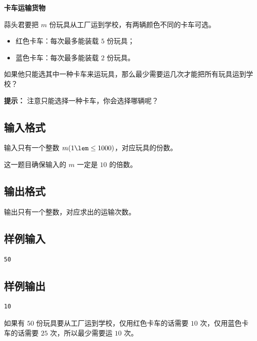 \documentclass{article}
\newcommand{\problemname}[1]{\begin{center}\Large\bfseries #1\end{center}}
\begin{document}
\problemname{卡车运输货物}

蒜头君要把 $m$ 份玩具从工厂运到学校，有两辆颜色不同的卡车可选。

\begin{itemize}
  \item 红色卡车：每次最多能装载 $5$ 份玩具；

  \item 蓝色卡车：每次最多能装载 $2$ 份玩具。

\end{itemize}
如果他只能选其中一种卡车来运玩具，那么最少需要运几次才能把所有玩具运到学校？

\textbf{提示：} 注意只能选择一种卡车，你会选择哪辆呢？

\subsection*{输入格式}
输入只有一个整数 $m(1\lem\le1000)$，对应玩具的份数。

这一题目确保输入的 $m$ 一定是 $10$ 的倍数。

\subsection*{输出格式}
输出只有一个整数，对应求出的运输次数。

\subsection*{样例输入}
\begin{verbatim}
50
\end{verbatim}

\subsection*{样例输出}
\begin{verbatim}
10
\end{verbatim}

如果有 $50$ 份玩具要从工厂运到学校，仅用红色卡车的话需要 $10$ 次，仅用蓝色卡车的话需要 $25$ 次，所以最少需要运 $10$ 次。
\end{document}
